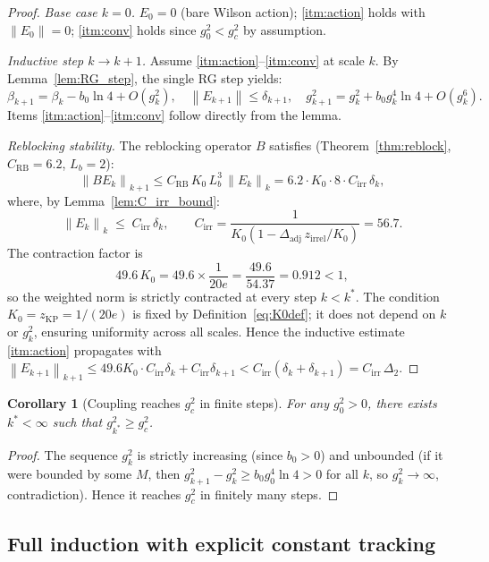 \documentclass[11pt,a4paper]{amsart}
\newtheorem{corollary}[theorem]{Corollary}
\theoremstyle{definition}
\newcommand{\norm}[1]{\left\|#1\right\|}
\newcommand{\gB}{g^2_c}
\newcommand{\zKP}{z_{\mathrm{KP}}}
\newcommand{\CRB}{C_{\mathrm{RB}}}
\begin{document}
\begin{proof}
\textit{Base case $k=0$.}
$E_0 = 0$ (bare Wilson action); \ref{itm:action} holds with $\|E_0\|=0$;
\ref{itm:conv} holds since $g^2_0 < \gB$ by assumption.

\textit{Inductive step $k\to k+1$.}
Assume \ref{itm:action}--\ref{itm:conv} at scale $k$.
By Lemma~\ref{lem:RG_step}, the single RG step yields:
\[
  \beta_{k+1} = \beta_k - b_0\ln 4 + O(g^2_k), \quad
  \norm{E_{k+1}} \le \delta_{k+1}, \quad
  g^2_{k+1} = g^2_k + b_0 g^4_k\ln 4 + O(g^6_k).
\]
Items \ref{itm:action}--\ref{itm:conv} follow directly from the lemma.

\textit{Reblocking stability.}
The reblocking operator $B$ satisfies (Theorem~\ref{thm:reblock},
$\CRB = 6.2$, $L_b = 2$):
\[
  \norm{BE_k}_{k+1} \le \CRB\,K_0\,L_b^3\,\norm{E_k}_k
  = 6.2 \cdot K_0 \cdot 8 \cdot C_{\mathrm{irr}}\,\delta_k,
\]
where, by Lemma~\ref{lem:C_irr_bound}:
\[
  \norm{E_k}_k
  \;\le\; C_{\mathrm{irr}}\,\delta_k,
  \qquad
  C_{\mathrm{irr}}
  = \frac{1}{K_0(1-\Delta_{\mathrm{adj}}\,z_{\mathrm{irrel}}/K_0)}
  = 56.7.
\]
The contraction factor is
\[
  49.6\,K_0 = 49.6\times\frac{1}{20e} = \frac{49.6}{54.37} = 0.912 < 1,
\]
so the weighted norm is strictly contracted at every step $k < k^*$.
The condition $K_0 = \zKP = 1/(20e)$ is fixed by Definition~\eqref{eq:K0def};
it does not depend on $k$ or $g^2_k$, ensuring uniformity across all scales.
Hence the inductive estimate \ref{itm:action} propagates with
$\norm{E_{k+1}}_{k+1} \le 49.6 K_0 \cdot C_{\mathrm{irr}}\delta_k
+ C_{\mathrm{irr}}\delta_{k+1}
< C_{\mathrm{irr}}(\delta_k + \delta_{k+1}) = C_{\mathrm{irr}}\,\Delta_2$.
\end{proof}

\begin{corollary}[Coupling reaches $\gB$ in finite steps]
\label{cor:finite}
For any $g^2_0 > 0$, there exists $k^* < \infty$ such that $g^2_{k^*} \ge \gB$.
\end{corollary}
\begin{proof}
The sequence $g^2_k$ is strictly increasing (since $b_0 > 0$) and
unbounded (if it were bounded by some $M$, then $g^2_{k+1} - g^2_k
\ge b_0 g^4_0 \ln 4 > 0$ for all $k$, so $g^2_k\to\infty$, contradiction).
Hence it reaches $\gB$ in finitely many steps.
\end{proof}

\subsection{Full induction with explicit constant tracking}
\label{sec:RG_full}
\end{document}

